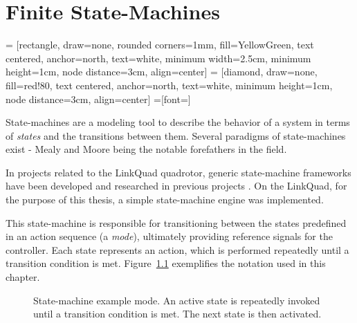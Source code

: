 \chapter{Finite State-Machines}
\label{cha:logic}
     = [rectangle, draw=none, rounded corners=1mm, fill=YellowGreen,
                    text centered, anchor=north, text=white, minimum width=2.5cm, minimum height=1cm, node distance=3cm, align=center]
     = [diamond, draw=none, fill=red!80,
                    text centered, anchor=north, text=white, minimum height=1cm, node distance=3cm, align=center]
    =[font=\scriptsize]

    State-machines are a modeling tool to describe the behavior of a system
    in terms of \textit{states} and the transitions between them.
    Several paradigms of state-machines exist - Mealy and Moore being the notable forefathers in the field.

    In projects related to the LinkQuad quadrotor, generic state-machine
    frameworks have been developed and researched in previous projects \citep{Merz06,Wzorek11}.
    On the LinkQuad, for the purpose of this thesis, a simple state-machine engine
    was implemented.%

    This state-machine is responsible for transitioning between the
    states predefined in an action sequence (a \textit{mode}), ultimately
    providing reference signals for the controller.
    Each state represents an action, which is performed repeatedly until
    a transition condition is met.
    Figure~\ref{fig:logic:statemachine} exemplifies the notation used in this chapter.

    \begin{figure}[H]
        \noindent{}
        \caption{State-machine example mode. An active state is repeatedly invoked until a transition condition is met. The next state is then activated.}
        \label{fig:logic:statemachine}
    \end{figure}

